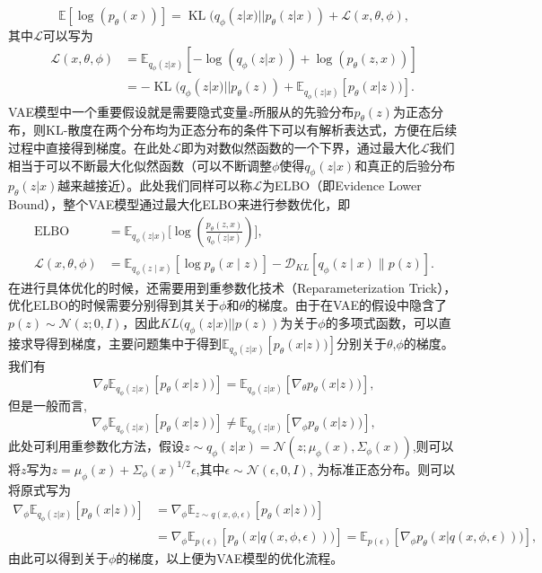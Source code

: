 \begin{equation}
    \mathbb{E}[\log(p_{\theta}(x))] = \operatorname{KL}(q_{\phi}(z|x)||p_{\theta}(z|x)) + \mathcal{L}(x,\theta,\phi),
\end{equation}
其中$\mathcal{L}$可以写为
\begin{align}
    \mathcal{L}(x,\theta,\phi) &= \mathbb{E}_{q_{\phi}(z|x)}\left[-\log(q_{\phi}(z|x))+\log(p_{\theta}(z,x))\right]\\
    &=-\operatorname{KL}(q_{\phi}(z|x)||p_{\theta}(z))+\mathbb{E}_{q_{\phi}(z|x)}\left[p_{\theta}(x|z))\right].
\end{align}
VAE模型中一个重要假设就是需要隐式变量$z$所服从的先验分布$p_{\theta}(z)$为正态分布，则KL-散度在两个分布均为正态分布的条件下可以有解析表达式，方便在后续过程中直接得到梯度。在此处$\mathcal{L}$即为对数似然函数的一个下界，通过最大化$\mathcal{L}$我们相当于可以不断最大化似然函数（可以不断调整$\phi$使得$q_{\phi}(z|x)$和真正的后验分布$p_{\theta}(z|x)$越来越接近）。此处我们同样可以称$\mathcal{L}$为ELBO（即Evidence Lower Bound），整个VAE模型通过最大化ELBO来进行参数优化，即
\begin{align}
\operatorname{ELBO}&=\mathbb{E}_{q_{\phi}(z|x)}\big[\log(\frac{p_{\theta}(z,x)}{q_{\phi}(z|x)})\big],\\
    \mathcal{L}(x,\theta, \phi)&=\mathbb{E}_{q_\phi(z \mid x)}\left[\log p_\theta(x \mid z)\right]-\mathcal{D}_{K L}\left[q_\phi(z \mid x) \| p(z)\right].
    \end{align}
在进行具体优化的时候，还需要用到重参数化技术（Reparameterization Trick），优化ELBO的时候需要分别得到其关于$\phi$和$\theta$的梯度。由于在VAE的假设中隐含了$p(z)\sim \mathcal{N}(z;0,I)$，因此$KL(q_{\phi}(z|x)||p(z))$为关于$\phi$的多项式函数，可以直接求导得到梯度，主要问题集中于得到$\mathbb{E}_{q_{\phi}(z|x)}\left[p_{\theta}(x|z))\right]$分别关于$\theta$,$\phi$的梯度。我们有
\begin{equation}
    \nabla_{\theta}\mathbb{E}_{q_{\phi}(z|x)}\left[p_{\theta}(x|z))\right] = \mathbb{E}_{q_{\phi}(z|x)}\left[\nabla_{\theta}p_{\theta}(x|z))\right],
\end{equation}
但是一般而言,
\begin{equation}
    \nabla_{\phi}\mathbb{E}_{q_{\phi}(z|x)}\left[p_{\theta}(x|z))\right]\neq \mathbb{E}_{q_{\phi}(z|x)}\left[\nabla_{\phi}p_{\theta}(x|z))\right],
\end{equation}
此处可利用重参数化方法，假设$z\sim q_{\phi}(z|x)=\mathcal{N}(z;\mu_{\phi}(x),\Sigma_{\phi}(x))$,则可以将$z$写为$z = \mu_{\phi}(x) +\Sigma_{\phi}(x)^{1/2} \epsilon $,其中$\epsilon \sim \mathcal{N}(\epsilon,0,I)$, 为标准正态分布。则可以将原式写为
\begin{align}
    \nabla_{\phi}\mathbb{E}_{q_{\phi}(z|x)}\left[p_{\theta}(x|z))\right]&=\nabla_{\phi}\mathbb{E}_{z\sim q(x,\phi,\epsilon)}\left[p_{\theta}(x|z))\right]\\
    &= \nabla_{\phi}\mathbb{E}_{p(\epsilon)}\left[p_{\theta}(x|q(x,\phi,\epsilon)))\right]= \mathbb{E}_{p(\epsilon)}\left[\nabla_{\phi} p_{\theta}(x|q(x,\phi,\epsilon)))\right],
\end{align}
由此可以得到关于$\phi$的梯度，以上便为VAE模型的优化流程。

